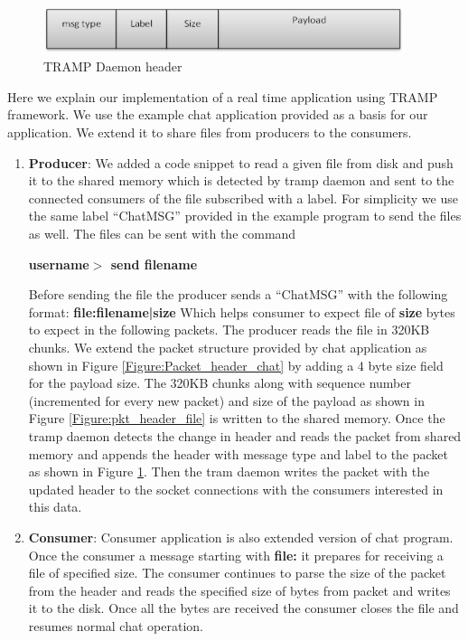 \begin{figure}[ht!]
\centering
 \includegraphics[width=300pt]{tramp_pkt.png}
\caption{TRAMP Daemon header}
\label{Figure:tramp_header}
\end{figure}
Here we explain our implementation of a real time application using TRAMP framework. We use the example chat application provided as a basis for our application. We extend it to share files from producers to the consumers.
\begin{enumerate}
 \item \textbf{Producer}: We added a code snippet to read a given file from disk and push it to the shared memory which is detected by tramp daemon and sent to the connected consumers of the file subscribed with a label. For simplicity we use the same label ``ChatMSG'' provided in the example program to send the files as well. The files can be sent with the command

 \textbf{username$>$ send filename}

Before sending the file the producer sends a ``ChatMSG'' with the following format:
\textbf{file:filename|size}
Which helps consumer to expect file of \textbf{size} bytes to expect in the following packets. The producer reads the file in 320KB chunks. We extend the packet structure provided by chat application as shown in Figure \ref{Figure:Packet_header_chat} by adding a 4 byte size field for the payload size. The 320KB chunks along with sequence number (incremented for every new packet) and size of the payload as shown in Figure \ref{Figure:pkt_header_file} is written to the shared memory. Once the tramp daemon detects the change in header and reads the packet from shared memory and appends the header with message type and label to the packet as shown in Figure \ref{Figure:tramp_header}. Then the tram daemon writes the packet with the updated header to the socket connections with the consumers interested in this data.

\item \textbf{Consumer}: Consumer application is also extended version of chat program. Once the consumer a message starting with \textbf{file:} it prepares for receiving a file of specified size. The consumer continues to parse the size of the packet from the header and reads the specified size of bytes from packet and writes it to the disk. Once all the bytes are received the consumer closes the file and resumes normal chat operation. 
\end{enumerate}







